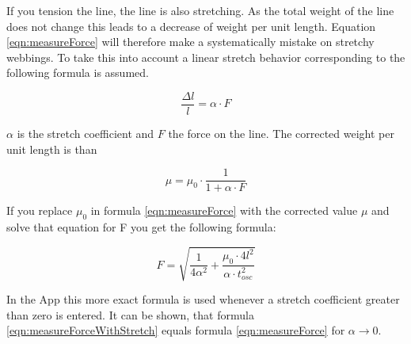 If you tension the line, the line is also stretching. As the total weight of the line does not change this leads to a decrease of weight per unit length. Equation \ref{eqn:measureForce} will therefore make a systematically mistake on stretchy webbings. To take this into account a linear stretch behavior corresponding to the following formula is assumed.

\begin{equation}
	\frac{\Delta l}{l} = \alpha \cdot F
\end{equation}

$\alpha$ is the stretch coefficient and $F$ the force on the line. The corrected weight per unit length is than

\begin{equation}
	\mu = \mu_0 \cdot \frac{1}{1+\alpha\cdot F}
\end{equation}

If you replace $\mu_0$ in formula \ref{eqn:measureForce} with the corrected value $\mu$ and solve that equation for F you get the following formula:

\begin{equation}
	F = \sqrt{\frac{1}{4 \alpha^2} + \frac{\mu_0\cdot 4l^2}{\alpha \cdot t_{osc}^2}}
	\label{eqn:measureForceWithStretch}
\end{equation}

In the App this more exact formula is used whenever a stretch coefficient greater than zero is entered.
It can be shown, that formula \ref{eqn:measureForceWithStretch} equals formula \ref{eqn:measureForce} for $\alpha\rightarrow 0$.